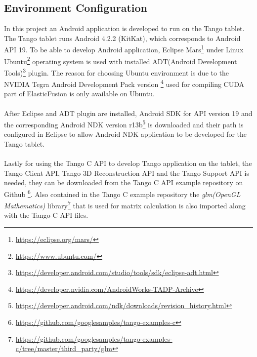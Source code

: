 \documentclass[12pt,twoside]{article}
\begin{document}
\subsection{Environment Configuration}
In this project an Android application is developed to run on the Tango tablet. The Tango tablet runs Android 4.2.2 (KitKat), which corresponds to Android API 19. To be able to develop Android application, Eclipse Mars\footnote{\url{https://eclipse.org/mars/}} under Linux Ubuntu\footnote{\url{https://www.ubuntu.com/}} operating system is used with installed ADT(Android Development Tools)\footnote{\url{https://developer.android.com/studio/tools/sdk/eclipse-adt.html}} plugin. The reason for choosing Ubuntu environment is due to the NVIDIA Tegra Android Development Pack version \footnote{\url{https://developer.nvidia.com/AndroidWorks-TADP-Archive}} used for compiling CUDA part of ElasticFusion is only available on Ubuntu.\\
\\
After Eclipse and ADT plugin are installed, Android SDK for API version 19 and the corresponding Android NDK version r13b\footnote{\url{https://developer.android.com/ndk/downloads/revision_history.html}} is downloaded and their path is configured in Eclipse to allow Android NDK application to be developed for the Tango tablet.\\
\\
Lastly for using the Tango C API to develop Tango application on the tablet, the Tango Client API, Tango 3D Reconstruction API and the Tango Support API is needed, they can be downloaded from the Tango C API example repository on Github \footnote{\url{https://github.com/googlesamples/tango-examples-c}}. Also contained in the Tango C example repository the \textit{glm(OpenGL Mathematics)} library\footnote{\url{https://github.com/googlesamples/tango-examples-c/tree/master/third_party/glm}} that is used for matrix calculation is also imported along with the Tango C API files.
\end{document}
